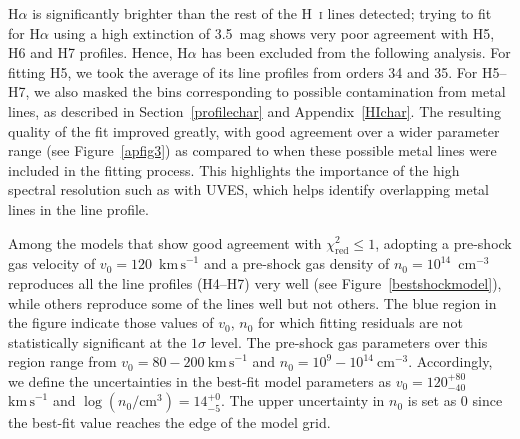 \documentclass{aa}
\newcommand{\Ha}{\ensuremath{\mathrm{H}\alpha}\xspace}
\newcommand{\Hi}{H~\textsc{i}\xspace}
\newcommand{\kms}{\ensuremath{\mathrm{km\,s}^{-1}}\xspace}
\newcommand{\cmcube}{\ensuremath{\mathrm{cm}^{-3}}\xspace}
\begin{document}
\begin{appendix}
\Ha is significantly brighter than the rest of the \Hi lines detected; trying to fit for \Ha using a high extinction of 3.5~mag shows very poor agreement with H5, H6 and H7 profiles. Hence, \Ha has been excluded from the following analysis. For fitting H5, we took the average of its line profiles from orders 34 and 35. For H5--H7, we also masked the bins corresponding to possible contamination from metal lines, as described in Section~\ref{profilechar} and Appendix~\ref{HIchar}. The resulting quality of the fit improved greatly, with good agreement over a wider parameter range (see Figure~\ref{apfig3}) as compared to when these possible metal lines were included in the fitting process. This highlights the importance of the high spectral resolution such as with UVES, which helps identify overlapping metal lines in the line profile. 

Among the models that show good agreement with $\chi_\mathrm{red}^2\leq1$, adopting a pre-shock gas velocity of $v_0=120$~\kms and a pre-shock gas density of $n_0=10^{14}$~\cmcube reproduces all the line profiles (H4--H7) very well (see Figure~\ref{bestshockmodel}), while others reproduce some of the lines well but not others.  The blue region in the figure indicate those values of $v_0,\,n_0$ for which fitting residuals are not statistically significant at the $1\sigma$ level. The pre-shock gas parameters over this region range from $v_0=80-200~\kms$ and $n_0=10^9-10^{14}~\cmcube$. Accordingly, we define the uncertainties in the best-fit model parameters as $v_0=120^{+80}_{-40}$~\kms and $\log (n_0/\textrm{cm}^3) = 14_{-5}^{+0}$. The upper uncertainty in  $n_0$ is set as 0 since the best-fit value reaches the edge of the model grid. 



\end{appendix}
\end{document}

